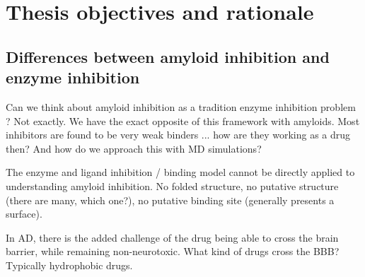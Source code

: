 \section{Thesis objectives and rationale}
\subsection{Differences between amyloid inhibition and enzyme inhibition}
\begin{outline}
    \1 Can we think about amyloid inhibition as a tradition enzyme inhibition problem ? Not exactly. We have the exact opposite of this framework with amyloids. Most inhibitors are found to be very weak binders ... how are they working as a drug then? And how do we approach this with MD simulations?

    \1 The enzyme and ligand inhibition / binding model cannot be directly applied to understanding amyloid inhibition.  No folded structure, no putative structure (there are many, which one?), no putative binding site (generally presents a surface).

    \1 In AD, there is the added challenge of the drug being able to cross the brain barrier, while remaining non-neurotoxic.  What kind of drugs cross the BBB?  Typically hydrophobic drugs.
\end{outline}    

